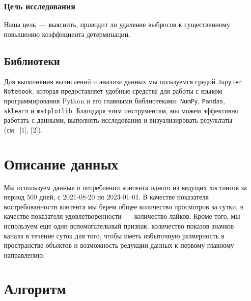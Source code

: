 \documentclass[a4paper,12pt]{article}
\begin{document}
\subsubsection{Цель исследования} Наша цель — выяснить, приводит ли удаление выбросов к существенному повышению коэффициента детерминации.

\subsection{Библиотеки}
Для выполнения вычислений и анализа данных мы пользуемся средой \texttt{Jupyter Notebook}, которая предоставляет удобные средства для работы с языком программирования Python и его главными библиотеками: \texttt{NumPy}, \texttt{Pandas}, \texttt{sklearn} и \texttt{matplotlib}. Благодаря этим инструментам, мы можем эффективно работать с данными, выполнять исследования и визуализировать результаты (см. [1], [2]). 



\section{Описание данных}
Мы используем данные о потреблении контента одного из ведущих хостингов за период 500 дней, с 2021-08-20 по 2023-01-01. В качестве показателя востребованности контента мы берем общее количество просмотров за сутки, в качестве показателя удовлетворенности — количество лайков. Кроме того, мы используем еще один вспомогательный признак: количество показов значков канала в течение суток для того, чтобы иметь избыточную размерность в пространстве объектов и возможность редукции данных к первому главному направлению.

\section{Алгоритм}
\end{document}
